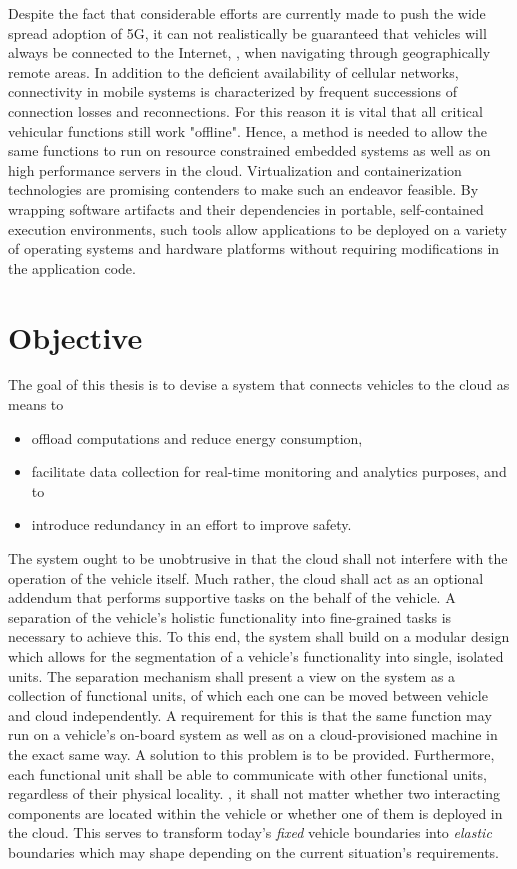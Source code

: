 Despite the fact that considerable efforts are currently made to push the wide spread adoption of 5G, it can not realistically be guaranteed that vehicles will always be connected to the Internet, \eg , when navigating through geographically remote areas. In addition to the deficient availability of cellular networks, connectivity in mobile systems is characterized by frequent successions of connection losses and reconnections. For this reason it is vital that all critical vehicular functions still work "offline". Hence, a method is needed to allow the same functions to run on resource constrained embedded systems as well as on high performance servers in the cloud. Virtualization and containerization technologies are promising contenders to make such an endeavor feasible. By wrapping software artifacts and their dependencies in portable, self-contained execution environments, such tools allow applications to be deployed on a variety of operating systems and hardware platforms without requiring modifications in the application code.

%
%
%
%
%
%
%
%
%
%

\section{Objective}
The goal of this thesis is to devise a system that connects vehicles to the cloud as means to 
\begin{itemize}
\item offload computations and reduce energy consumption,
\item facilitate data collection for real-time monitoring and analytics purposes, and to
\item introduce redundancy in an effort to improve safety.
\end{itemize} 
The system ought to be unobtrusive in that the cloud shall not interfere with the operation of the vehicle itself. Much rather, the cloud shall act as an optional addendum that performs supportive tasks on the behalf of the vehicle. A separation of the vehicle's holistic functionality into fine-grained tasks is necessary to achieve this. To this end, the system shall build on a modular design which allows for the segmentation of a vehicle's functionality into single, isolated units. The separation mechanism shall present a view on the system as a collection of functional units, of which each one can be moved between vehicle and cloud independently. A requirement for this is that the same function may run on a vehicle's on-board system as well as on a cloud-provisioned machine in the exact same way. A solution to this problem is to be provided. Furthermore, each functional unit shall be able to communicate with other functional units, regardless of their physical locality. \Ie , it shall not matter whether two interacting components are located within the vehicle or whether one of them is deployed in the cloud. This serves to transform today's \emph{fixed} vehicle boundaries into \emph{elastic} boundaries which may shape depending on the current situation's requirements.

